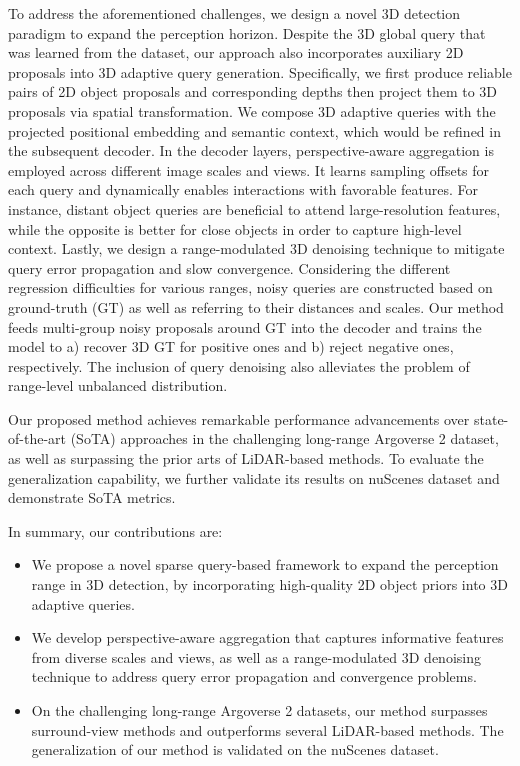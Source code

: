 \documentclass[letterpaper]{article} \usepackage{aaai24}
\begin{document}
To address the aforementioned challenges, we design a novel 3D detection paradigm to expand the perception horizon. Despite the 3D global query that was learned from the dataset, our approach also incorporates auxiliary 2D proposals into 3D adaptive query generation. 
Specifically, we first produce reliable pairs of 2D object proposals and corresponding depths then project them to 3D proposals via spatial transformation. We compose 3D adaptive queries with the projected positional embedding and semantic context, which would be refined in the subsequent decoder.
In the decoder layers, perspective-aware aggregation is employed across different image scales and views. It learns sampling offsets for each query and dynamically enables interactions with favorable features. For instance, distant object queries are beneficial to attend large-resolution features, while the opposite is better for close objects in order to capture high-level context.
Lastly, we design a range-modulated 3D denoising technique to mitigate query error propagation and slow convergence. Considering the different regression difficulties for various ranges, noisy queries are constructed based on ground-truth (GT) as well as referring to their distances and scales. Our method feeds multi-group noisy proposals around GT into the decoder and trains the model to a) recover 3D GT for positive ones and b) reject negative ones, respectively. The inclusion of query denoising also alleviates the problem of range-level unbalanced distribution.


Our proposed method achieves remarkable performance advancements over state-of-the-art (SoTA) approaches in the challenging long-range Argoverse 2 dataset, as well as surpassing the prior arts of LiDAR-based methods. To evaluate the generalization capability, we further validate its results on nuScenes dataset and demonstrate SoTA metrics. 


In summary, our contributions are:
\begin{itemize}
\item We propose a novel sparse query-based framework to expand the perception range in 3D detection, by incorporating high-quality 2D object priors into 3D adaptive queries.
\item We develop perspective-aware aggregation that captures informative features from diverse scales and views, as well as a range-modulated 3D denoising technique to address query error propagation and convergence problems.
\item On the challenging long-range Argoverse 2 datasets, our method surpasses surround-view  methods and 
outperforms several LiDAR-based methods. The generalization of our method is validated on the nuScenes dataset. 


\end{itemize} 
\end{document}
